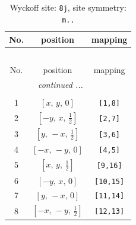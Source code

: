 \documentclass[fleqn,8pt]{jsarticle}
\begin{document}
\begin{longtable}{ccc}
\caption{Wyckoff site: {\tt 8j}, site symmetry: {\tt m..}}
 \\
 \hline \hline
No. & position & mapping \\ \hline \endfirsthead

\multicolumn{2}{l}{\tablename\ \thetable{}} \\
 \hline \hline
No. & position & mapping \\ \hline \endhead

 \hline \hline
\multicolumn{2}{r}{\footnotesize\it continued ...} \\ \endfoot

 \hline \hline
\multicolumn{2}{r}{} \\ \endlastfoot

1 & $\left[ x,\, y,\, 0 \right]$ & {\tt [1,8]} \\ \hline
2 & $\left[ - y,\, x,\, \frac{1}{2} \right]$ & {\tt [2,7]} \\ \hline
3 & $\left[ y,\, - x,\, \frac{1}{2} \right]$ & {\tt [3,6]} \\ \hline
4 & $\left[ - x,\, - y,\, 0 \right]$ & {\tt [4,5]} \\ \hline
5 & $\left[ x,\, y,\, \frac{1}{2} \right]$ & {\tt [9,16]} \\ \hline
6 & $\left[ - y,\, x,\, 0 \right]$ & {\tt [10,15]} \\ \hline
7 & $\left[ y,\, - x,\, 0 \right]$ & {\tt [11,14]} \\ \hline
8 & $\left[ - x,\, - y,\, \frac{1}{2} \right]$ & {\tt [12,13]} \\
\end{longtable}
\renewcommand{\arraystretch}{1.2}
\end{document}
